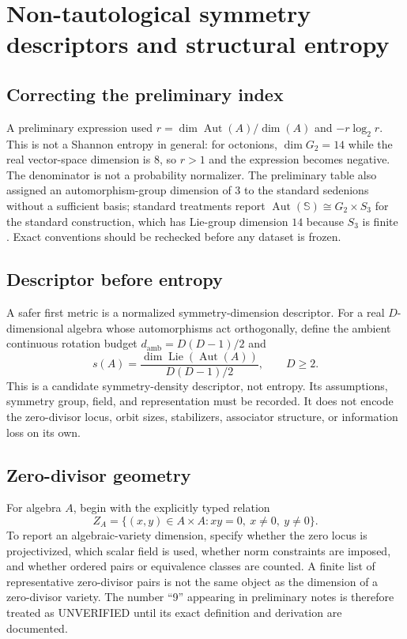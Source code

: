 \documentclass[11pt,oneside]{article}
\newcommand{\Aut}{\operatorname{Aut}}
\newcommand{\UNVERIFIED}{\textsf{UNVERIFIED}}
\begin{document}
\section{Non-tautological symmetry descriptors and structural entropy}
\subsection{Correcting the preliminary index}
A preliminary expression used $r=\dim\Aut(A)/\dim(A)$ and $-r\log_2r$. This is not a Shannon entropy in general: for octonions, $\dim G_2=14$ while the real vector-space dimension is $8$, so $r>1$ and the expression becomes negative. The denominator is not a probability normalizer. The preliminary table also assigned an automorphism-group dimension of $3$ to the standard sedenions without a sufficient basis; standard treatments report $\Aut(\mathbb S)\cong G_2\times S_3$ for the standard construction, which has Lie-group dimension $14$ because $S_3$ is finite \cite{g2sedenion2021}. Exact conventions should be rechecked before any dataset is frozen.

\subsection{Descriptor before entropy}
A safer first metric is a normalized symmetry-dimension descriptor. For a real $D$-dimensional algebra whose automorphisms act orthogonally, define the ambient continuous rotation budget $d_{\mathrm{amb}}=D(D-1)/2$ and
\[
s(A)=\frac{\dim\operatorname{Lie}(\Aut(A))}{D(D-1)/2},\qquad D\geq 2.
\]
This is a candidate symmetry-density descriptor, not entropy. Its assumptions, symmetry group, field, and representation must be recorded. It does not encode the zero-divisor locus, orbit sizes, stabilizers, associator structure, or information loss on its own.

\subsection{Zero-divisor geometry}
For algebra $A$, begin with the explicitly typed relation
\[
Z_A=\{(x,y)\in A\times A: xy=0,\ x\neq 0,\ y\neq 0\}.
\]
To report an algebraic-variety dimension, specify whether the zero locus is projectivized, which scalar field is used, whether norm constraints are imposed, and whether ordered pairs or equivalence classes are counted. A finite list of representative zero-divisor pairs is not the same object as the dimension of a zero-divisor variety. The number ``9'' appearing in preliminary notes is therefore treated as \UNVERIFIED{} until its exact definition and derivation are documented.
\end{document}
